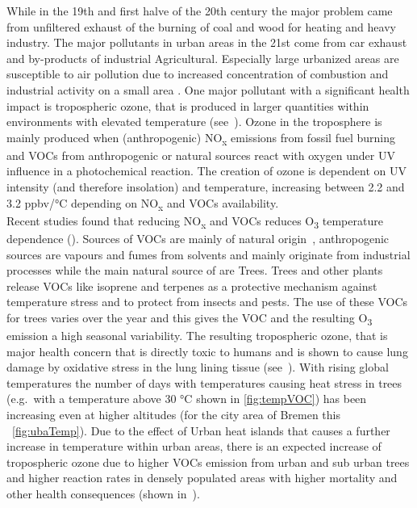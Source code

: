 \documentclass[12pt,a4paper, english]{article}
\begin{document}
      While in the 19th and first halve of the 20th century the major problem came from unfiltered exhaust of the burning of coal and wood for heating and heavy industry.
      The major pollutants in urban areas in the 21st come from car exhaust and by-products of industrial Agricultural. %
      Especially large urbanized areas are susceptible to air pollution due to increased concentration of combustion and industrial activity on a small area \autocite{Kanakidou2011}.
      One major pollutant with a significant health impact is tropospheric ozone, that is produced in larger quantities within environments with elevated temperature (see~\cite{Ebi2008}). 
      Ozone in the troposphere is mainly produced when (anthropogenic) NO\textsubscript{x} emissions from fossil fuel burning and \glspl{VOC} from anthropogenic or natural sources react with oxygen under UV influence in a photochemical reaction.  
      The creation of ozone is dependent on UV intensity (and therefore insolation) and temperature, increasing between 2.2 and 3.2 ppbv/°C depending on NO\textsubscript{x} and \glspl{VOC} availability. \\
      Recent studies found that reducing NO\textsubscript{x} and \glspl{VOC} reduces O\textsubscript{3} temperature dependence (\cite{Otero2021}).
      Sources of \glspl{VOC} are mainly of natural origin~\autocite{Kansal2009}, anthropogenic sources are vapours and fumes from solvents and mainly originate from industrial processes while the main natural source of  are Trees.
      Trees and other plants release VOCs like isoprene and terpenes as a protective mechanism against temperature stress and to protect from insects and pests. 
      The use of these \glspl{VOC} for trees varies over the year and this gives the \gls{VOC} and the resulting O\textsubscript{3} emission a high seasonal variability. 
      The resulting tropospheric ozone, that is major health concern that is directly toxic to humans and is shown to cause lung damage by oxidative stress in the lung lining tissue (see~\cite{Mudway2000}). 
      With rising global temperatures the number of days with temperatures causing heat stress in trees (e.g.\ with a temperature above 30 °C shown in \cref{fig:tempVOC}) has been increasing even at higher altitudes (for the city area of Bremen this ~\cref{fig:ubaTemp}).
      Due to the effect of Urban heat islands that causes a further increase in temperature within urban areas, there is an expected increase of tropospheric ozone due to higher \glspl{VOC} emission from urban and sub urban trees and higher reaction rates in densely populated areas with higher mortality and other health consequences (shown in~\cite{Ebi2008}).\\ 
\end{document}
